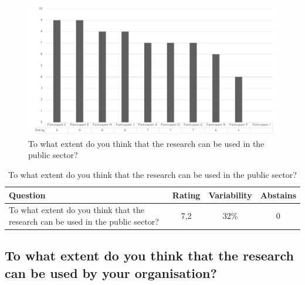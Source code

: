 \begin{figure}[H]
	\centering
	\includegraphics[width=0.9\linewidth]{images/validationresult_researchrelevancepublicsector}
	\caption[To what extent do you think that the research can be used in the public sector?]{To what extent do you think that the research can be used in the public sector?}
	\label{fig:validationrelevantps}
\end{figure}
\begin{table}[H]
	\centering
	\begin{tabular}{p{}ccc}
		\toprule
		\textbf{Question} & \textbf{Rating} & \textbf{Variability} & \textbf{Abstains} \\
		\midrule
		To what extent do you think that the research can be used in the public sector? & 7,2 & 32\% & 0 \\%
		\bottomrule
	\end{tabular}%
	\caption[To what extent do you think that the research can be used in the public sector?]{To what extent do you think that the research can be used in the public sector?}
	\label{tab:validationrelevantps}%
\end{table}%

\subsection{To what extent do you think that the research can be used by your organisation?}
\label{sub:validationrelevantorganisation}

